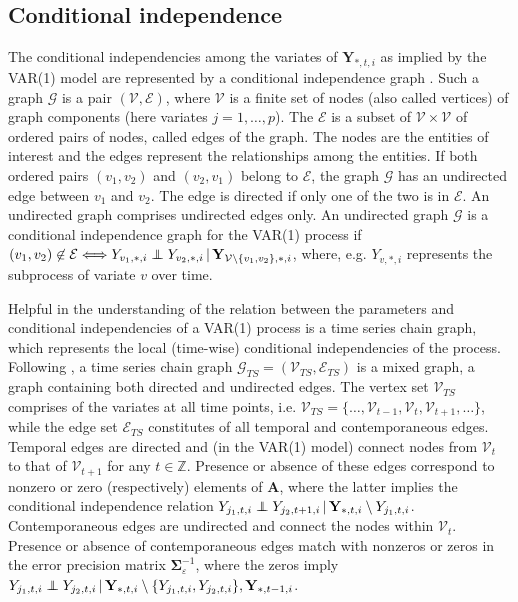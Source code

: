 \subsection{Conditional independence}
The conditional independencies among the variates of $\mathbf{Y}_{\ast,t,i}$ as implied by the VAR(1) model are represented by a conditional independence graph \citep{Whittaker1990}. Such a graph $\mathcal{G}$ is a pair $(\mathcal{V}, \mathcal{E})$, where $\mathcal{V}$ is a finite set of nodes (also called vertices) of graph components (here variates $j=1, \ldots, p$). The $\mathcal{E}$ is a subset of $\mathcal{V} \times \mathcal{V}$ of ordered pairs of nodes, called edges of the graph. The nodes are the entities of interest and the edges represent the relationships among the entities. If both ordered pairs $(v_1, v_2)$ and $(v_2, v_1)$ belong to $\mathcal{E}$, the graph $\mathcal{G}$ has an undirected edge between $v_1$ and $v_2$. The edge is directed if only one of the two is in $\mathcal{E}$. An undirected graph comprises undirected edges only. An undirected graph  $\mathcal{G}$ is a conditional independence graph for the VAR(1) process if $(v_1, v_2) \not\in \mathcal{E} \Longleftrightarrow Y_{v_1, \ast, i} \independent Y_{v_2, \ast, i} \, | \, \mathbf{Y}_{\mathcal{V} \setminus \{v_1, v_2\}, \ast, i}$, where, e.g. $Y_{v, \ast, i}$ represents the subprocess of variate $v$ over time.

Helpful in the understanding of the relation between the parameters and conditional independencies of a VAR(1) process is a time series chain graph, which represents the local (time-wise) conditional independencies of the process. Following \cite{Dahlhaus2000, Dahlhaus2003}, a time series chain graph $\mathcal{G}_{TS} = (\mathcal{V}_{TS}, \mathcal{E}_{TS})$ is a mixed graph, a graph containing both directed and undirected edges. The vertex set $\mathcal{V}_{TS}$ comprises of the variates at all time points, i.e. $\mathcal{V}_{TS} = \{\ldots, \mathcal{V}_{t-1}, \mathcal{V}_{t}, \mathcal{V}_{t+1}, \ldots\}$, while the edge set $\mathcal{E}_{TS}$ constitutes of all temporal and contemporaneous edges. Temporal edges are directed and (in the VAR(1) model) connect nodes from $\mathcal{V}_{t}$ to that of $\mathcal{V}_{t+1}$ for any $t \in \mathbb{Z}$. Presence or absence of these edges correspond to nonzero or zero (respectively) elements of $\mathbf{A}$, where the latter implies the conditional independence relation $Y_{j_1, t, i} \independent Y_{j_2, t+1, i} \, | \, \mathbf{Y}_{\ast, t, i} \setminus Y_{j_1, t, i}$. Contemporaneous edges are undirected and connect the nodes within  $\mathcal{V}_{t}$. Presence or absence of contemporaneous edges match with nonzeros or zeros in the error precision matrix $\mathbf{\Sigma}_{\varepsilon}^{-1}$, where the zeros imply $Y_{j_1, t, i} \independent Y_{j_2, t, i} \, | \, \mathbf{Y}_{\ast, t, i} \setminus \{ Y_{j_1, t, i}, Y_{j_2, t, i} \}, \mathbf{Y}_{\ast, t-1, i}$.


